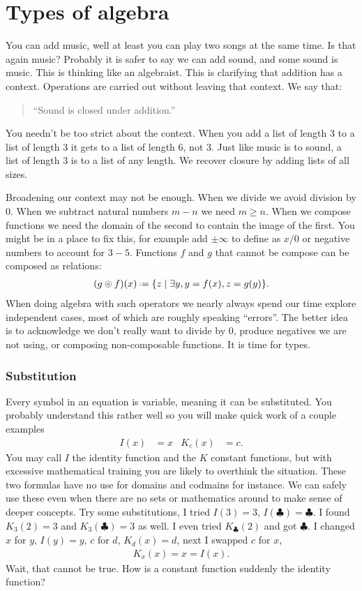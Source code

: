 \chapter{Types of algebra}

You can add music, well at least you can play two songs at the same time.
Is that again music?  Probably it is safer to say we can add sound, and 
some sound is music.  This is thinking like an algebraist.  This is 
clarifying that addition has a context.  Operations are carried out 
without leaving that context.  We say that:
\begin{quote}
    ``Sound is closed under addition.''
\end{quote}
You needn't be too strict about the context.
When you add a list of length 3 to a 
list of length 3 it gets to a list of length 6, not 3.
Just like music is to sound, a list of length 3 is to a list of any length.
We recover closure by adding lists of all sizes.

Broadening our context may not be enough.  When we divide 
we avoid division by $0$.  When we subtract natural numbers $m-n$
we need $m\geq n$.  When we compose functions we need the 
domain of the second to contain the image of the first.
You might be in a place to fix this, for example add $\pm\infty$ 
to define as $x/0$ or negative numbers to account for $3-5$.
Functions $f$ and $g$ that cannot be compose can be composed as relations:
\begin{align*}
    (g\circledcirc f)(x) \defeq \{z\mid \exists y, y=f(x), z=g(y)\}.
\end{align*}
When doing algebra with such operators we nearly always spend 
our time explore independent cases, most of which are 
roughly speaking ``errors''.  The better idea is to acknowledge 
we don't really want to divide by 0, produce negatives we are not using,
or composing non-composable functions.  It is time for types.

\subsection{Substitution}
Every symbol in an equation is variable, meaning it can be substituted.
You probably understand this rather well so you will make quick work 
of a couple examples
\begin{align*}
    I(x) & = x & 
    K_c(x) & = c.
\end{align*}
You may call $I$ the identity function and the $K$ constant functions, 
but with excessive mathematical training you are likely to overthink 
the situation.  These two formulas have no use for domains and codmains for 
instance.  We can safely use these even when there are no sets or mathematics 
around to make sense of deeper concepts.
Try some substitutions, I tried $I(3)=3$, $I(\clubsuit)=\clubsuit$.
I found $K_3(2)=3$ and $K_3(\clubsuit)=3$ as well.  I even tried 
$K_{\clubsuit}(2)$ and got $\clubsuit$.  I changed $x$ for $y$, 
$I(y)=y$, $c$ for $d$, $K_d(x)=d$, next I swapped $c$ for $x$, 
\begin{align*}
    K_x(x)=x=I(x).
\end{align*}
Wait, that cannot be true.  How is a constant function suddenly the 
identity function?  

